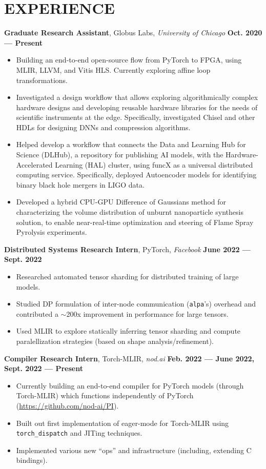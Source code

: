 \documentclass[11pt,letterpaper,roman,colorlinks,linkcolor=blue]{moderncv}
\newcommand*{\modern}{\fontfamily{qhv}\selectfont}
\newcommand{\mystyle}[1]{\textcolor{mygrey}{\modern #1}}
\newcommand{\mysectionstyle}[1]{\large\mystyle{#1}}
\begin{document}
\section{\mysectionstyle{EXPERIENCE}}

\textbf{Graduate Research Assistant}, Globus Labs, \emph{University of Chicago}
\hfill \textbf{Oct. 2020 --- Present}
\begin{itemize}
\item Building an end-to-end open-source flow from PyTorch to FPGA, using MLIR, LLVM, and Vitis HLS. Currently exploring affine loop transformations.
\item Investigated a design workflow that allows exploring algorithmically complex hardware designs and developing reusable hardware libraries for the needs of scientific instruments at the edge. Specifically, investigated Chisel and other HDLs for designing DNNs and compression algorithms.
\item Helped develop a workflow that connects the Data and Learning Hub for Science (DLHub), a repository for publishing AI models, with the Hardware-Accelerated Learning (HAL) cluster, using funcX as a universal distributed computing service. Specifically, deployed Autoencoder models for identifying binary black hole mergers in LIGO data.
\item Developed a hybrid CPU-GPU Difference of Gaussians method for characterizing the volume distribution of unburnt nanoparticle synthesis solution, to enable near-real-time optimization and steering of Flame Spray Pyrolysis experiments.\end{itemize}

\textbf{Distributed Systems Research Intern}, PyTorch, \emph{Facebook}
\hfill \textbf{June 2022 --- Sept. 2022}
\begin{itemize}
\item Researched automated tensor sharding for distributed training of large models.
\item Studied DP formulation of inter-node communication (\texttt{alpa}'s) overhead and contributed a $\sim$200x improvement in performance for large tensors.
\item Used MLIR to explore statically inferring tensor sharding and compute paralellization strategies (based on shape analysis/refinement).
\end{itemize}

\textbf{Compiler Research Intern}, Torch-MLIR, \emph{nod.ai}
\hfill \textbf{Feb. 2022 --- June 2022, Sept. 2022 --- Present}
\begin{itemize}
\item Currently building an end-to-end compiler for PyTorch models (through Torch-MLIR) which functions independently of PyTorch (\href{https://github.com/nod-ai/PI}{https://github.com/nod-ai/PI}).
\item Built out first implementation of eager-mode for Torch-MLIR using \texttt{torch\_dispatch} and JITing techniques.
\item Implemented various new ``ops'' and infrastructure (including, extending C bindings).
\end{itemize}
\end{document}
